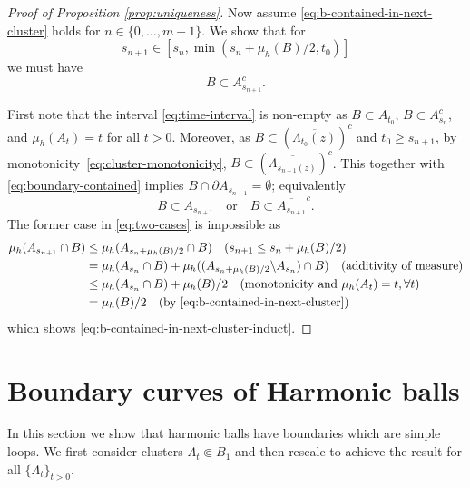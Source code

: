 \documentclass[12pt]{amsart}
\numberwithin{equation}{section}
\newcommand{\cluster}[2]{\hyperref[eq:non-co-set]{\mathit{\Lambda}^{#1}_{#2}}}
\newcommand{\regcluster}[2]{\hyperref[eq:regular-cluster]{\Lambda^{#1}_{#2}}}
\begin{document}
\begin{proof}[Proof of Proposition \ref{prop:uniqueness}]
		Now assume \eqref{eq:b-contained-in-next-cluster} holds for $n \in \{0,\dots,m-1\}$. 
		We show that for 
		\begin{equation} \label{eq:time-interval}
		s_{n+1} \in \left[ s_n ,  \min(s_n + \mu_h(B)/2, t_0) \right]
		\end{equation}
		we must have 
		\begin{equation} \label{eq:b-contained-in-next-cluster-induct}
		B \subset A_{s_{n+1}}^c.
		\end{equation}
		
		
		First note that the interval \eqref{eq:time-interval} is non-empty as $B \subset A_{t_0}$, $B \subset A_{s_n}^c$, 
		and $\mu_h(A_t) = t$ for all $t > 0$. 
		Moreover, as $B \subset  (\overline{\regcluster{}{t_0}(z)})^c$ and $t_0 \geq s_{n+1}$, by monotonicity~\eqref{eq:cluster-monotonicity}, $B \subset  (\overline{\regcluster{}{s_{n+1}(z)}})^c$.
		This together with \eqref{eq:boundary-contained} implies  $B \cap \partial A_{s_{n+1}} = \emptyset$; equivalently 
		\begin{equation} \label{eq:two-cases}
		B \subset A_{s_{n+1}} \quad \mbox{or} \quad B \subset \overline{A_{s_{n+1}}}^c. 
		\end{equation}
		The former case in \eqref{eq:two-cases} is impossible as 
		\begin{align*}
		\mu_h(A_{s_{n+1}} \cap B) &\leq \mu_h(A_{s_{n} + \mu_h(B)/2} \cap B)  \quad \mbox{($s_{n+1} \leq s_{n} + \mu_h(B)/2$)} \\
		&= \mu_h(A_{s_{n}} \cap B) + \mu_h((A_{s_{n} + \mu_h(B)/2} \backslash A_{s_{n}} ) \cap B) \quad \mbox{(additivity of measure)} \\
		&\leq \mu_h(A_{s_{n}} \cap B) + \mu_h(B)/2  \quad \mbox{(monotonicity and $\mu_h(A_t) = t, \forall t$)} \\
		&= \mu_h(B)/2 \quad \mbox{(by \eqref{eq:b-contained-in-next-cluster})}
		\end{align*}
		which shows \eqref{eq:b-contained-in-next-cluster-induct}.
	\end{proof}
	
	
	\section{Boundary curves of Harmonic balls} \label{sec:boundary-curves}
	
	In this section we show that harmonic balls have boundaries which are simple loops. 
	We first consider clusters ${\cluster{}{t}} \Subset B_1$ and then rescale to achieve the result
	for all $\{{\regcluster{}{t}}\}_{t > 0}$.  
	
\end{document}
